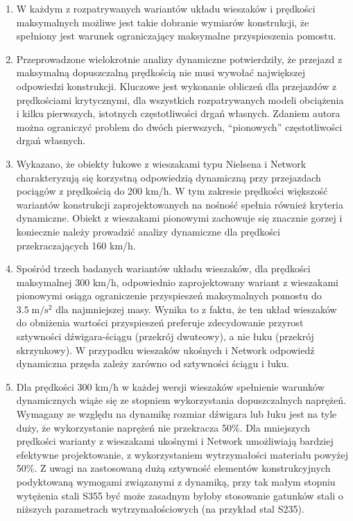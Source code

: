 \begin{enumerate}
	
\item W każdym z rozpatrywanych wariantów układu wieszaków i prędkości maksymalnych możliwe jest takie dobranie wymiarów konstrukcji, że spełniony jest warunek ograniczający maksymalne przyspieszenia pomostu.

\item Przeprowadzone wielokrotnie analizy dynamiczne potwierdziły, że przejazd z maksymalną dopuszczalną prędkością nie musi wywołać największej odpowiedzi konstrukcji. Kluczowe jest wykonanie obliczeń dla przejazdów z prędkościami krytycznymi, dla wszystkich rozpatrywanych modeli obciążenia i kilku pierwszych, istotnych częstotliwości drgań własnych. Zdaniem autora można ograniczyć problem do dwóch pierwszych, \enquote{pionowych} częstotliwości drgań własnych.
	
\item Wykazano, że obiekty łukowe z wieszakami typu Nielsena i Network charakteryzują się korzystną odpowiedzią dynamiczną przy przejazdach pociągów z prędkością do 200 km/h. W tym zakresie prędkości większość wariantów konstrukcji zaprojektowanych na nośność spełnia również kryteria dynamiczne. Obiekt z wieszakami pionowymi zachowuje się znacznie gorzej i koniecznie należy prowadzić analizy dynamiczne dla prędkości przekraczających 160 km/h. 

\item Spośród trzech badanych wariantów układu wieszaków, dla prędkości maksymalnej 300 km/h, odpowiednio zaprojektowany wariant z wieszakami pionowymi osiąga ograniczenie przyspieszeń maksymalnych pomostu do $3.5\;\mathrm{m/s^2}$ dla najmniejszej masy. Wynika to z faktu, że ten układ wieszaków do obniżenia wartości przyspieszeń preferuje zdecydowanie przyrost sztywności dźwigara-ściągu (przekrój dwuteowy), a nie łuku (przekrój skrzynkowy). W przypadku wieszaków ukośnych i Network odpowiedź dynamiczna przęsła zależy zarówno od sztywności ściągu i łuku.

\item Dla prędkości 300 km/h w każdej wersji wieszaków spełnienie warunków dynamicznych wiąże się ze stopniem wykorzystania dopuszczalnych naprężeń. Wymagany ze względu na dynamikę rozmiar dźwigara lub łuku jest na tyle duży, że wykorzystanie naprężeń nie przekracza 50\%. Dla mniejszych prędkości warianty z wieszakami ukośnymi i Network umożliwiają bardziej efektywne projektowanie, z wykorzystaniem wytrzymałości materiału powyżej 50\%. Z uwagi na zastosowaną dużą sztywność elementów konstrukcyjnych podyktowaną wymogami związanymi z dynamiką, przy tak małym stopniu wytężenia stali S355 być może zasadnym byłoby stosowanie gatunków stali o niższych parametrach wytrzymałościowych (na przykład stal S235).


\end{enumerate}
